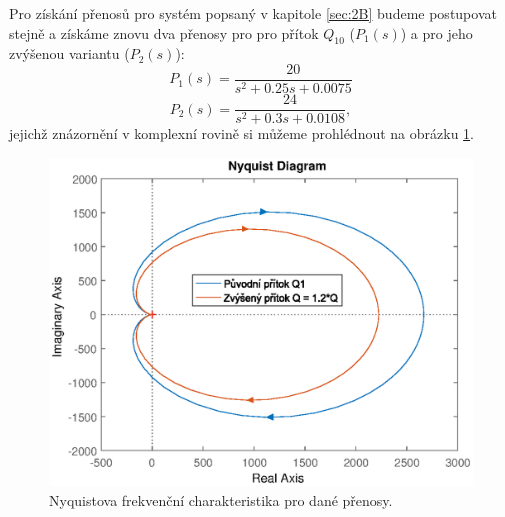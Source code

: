 \documentclass[a4paper,11pt]{article}
\begin{document}
\newpage 
Pro získání přenosů pro systém popsaný v kapitole \ref{sec:2B} budeme postupovat stejně a získáme znovu dva přenosy pro pro přítok $ Q_{10} $ ($ P_{1}\left ( s \right )  $) a pro jeho zvýšenou variantu ($ P_{2}\left ( s \right )  $):
\begin{equation}\label{eq:P-B1} 
P_{1}\left ( s \right ) =\frac{20}{s^{2} + 0.25 s + 0.0075}
\end{equation}
\begin{equation}\label{eq:P-B2} 
P_{2}\left ( s \right ) =\frac{24}{s^{2} + 0.3  s + 0.0108},
\end{equation}
jejichž znázornění v komplexní rovině si můžeme prohlédnout na obrázku \ref{fig:nyquist-B}.
\begin{figure}[htbp]
	\begin{center}
	\includegraphics[scale = 1.0]{obrazky/nyquistB.eps}
	\caption{Nyquistova frekvenční charakteristika pro dané přenosy.}
	\label{fig:nyquist-B}
	\end{center}
\end{figure}

\newpage 
\end{document}
